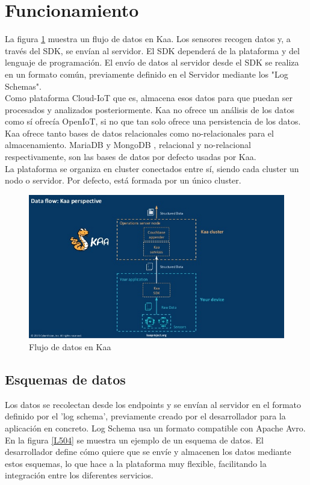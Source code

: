 \documentclass[12pt, twoside]{book}
\begin{document}
\section{Funcionamiento}
La figura \ref{L502} muestra un flujo de datos en Kaa. Los sensores recogen datos y, a través del SDK, se envían al servidor. El SDK dependerá de la plataforma y del lenguaje de programación. El envío de datos al servidor desde el SDK se realiza en un formato común, previamente definido en el Servidor mediante los "Log Schemas". \\
Como plataforma Cloud-IoT que es, almacena esos datos para que puedan ser procesados y analizados posteriormente. Kaa no ofrece un análisis de los datos como sí ofrecía OpenIoT, si no que tan solo ofrece una persistencia de los datos. Kaa ofrece tanto bases de datos relacionales como no-relacionales para el almacenamiento. MariaDB y MongoDB , relacional y no-relacional respectivamente, son las bases de datos por defecto usadas por Kaa.\\
La plataforma se organiza en cluster conectados entre sí, siendo cada cluster un nodo o servidor. Por defecto, está formada por un único cluster. 
\begin{figure}[H]
\centering
\includegraphics[scale=0.4]{images/kaa_platform1}
\caption{Flujo de datos en Kaa}\label{L502}
\end{figure} 
\subsection*{Esquemas de datos}
Los datos se recolectan desde los endpoints y se envían al servidor en el formato definido por el 'log schema', previamente creado por el desarrollador para la aplicación en concreto. Log Schema usa un formato compatible con Apache Avro. En la figura \ref{L504} se muestra un ejemplo de un esquema de datos. El desarrollador define cómo quiere que se envíe y almacenen los datos mediante estos esquemas, lo que hace a la plataforma muy flexible, facilitando la integración entre los diferentes servicios.\\
 
\end{document}
